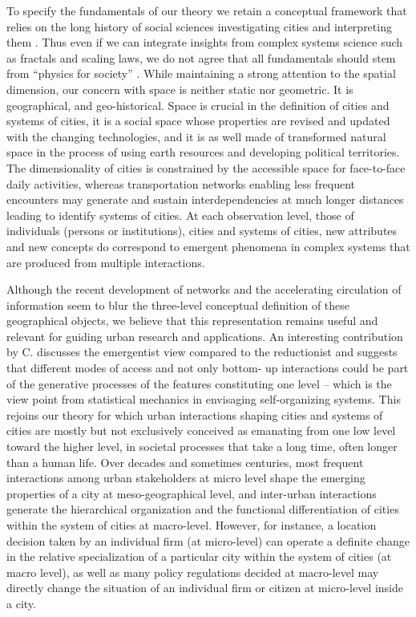 \documentclass[10pt]{article}
\begin{document}
To specify the fundamentals of our theory we retain a conceptual framework that relies on the long history of social sciences investigating cities and interpreting them \citep{pumain1996theoriser}. Thus even if we can integrate insights from complex systems science such as fractals and scaling laws, we do not agree that all fundamentals should stem from ``physics for society'' \citep{caldarelli2018physics}. While maintaining a strong attention to the spatial dimension, our concern with space is neither static nor geometric. It is geographical, and geo-historical. Space is crucial in the definition of cities and systems of cities, it is a social space whose properties are revised and updated with the changing technologies, and it is as well made of transformed natural space in the process of using earth resources and developing political territories. The dimensionality of cities is constrained by the accessible space for face-to-face daily activities, whereas transportation networks enabling less frequent encounters may generate and sustain interdependencies at much longer distances leading to identify systems of cities. At each observation level, those of individuals (persons or institutions), cities and systems of cities, new attributes and new concepts do correspond to emergent phenomena in complex systems that are produced from multiple interactions.

Although the recent development of networks and the accelerating circulation of information seem to blur the three-level conceptual definition of these geographical objects, we believe that this representation remains useful and relevant for guiding urban research and applications. An interesting contribution by C. \cite{roth2006reconstruction} discusses the emergentist view compared to the reductionist and suggests that different modes of access and not only bottom- up interactions could be part of the generative processes of the features constituting one level – which is the view point from statistical mechanics in envisaging self-organizing systems. This rejoins our theory for which urban interactions shaping cities and systems of cities are mostly but not exclusively conceived as emanating from one low level toward the higher level, in societal processes that take a long time, often longer than a human life. Over decades and sometimes centuries, most frequent interactions among urban stakeholders at micro level shape the emerging properties of a city at meso-geographical level, and inter-urban interactions generate the hierarchical organization and the functional differentiation of cities within the system of cities at macro-level. However, for instance, a location decision taken by an individual firm (at micro-level) can operate a definite change in the relative specialization of a particular city within the system of cities (at macro level), as well as many policy regulations decided at macro-level may directly change the situation of an individual firm or citizen at micro-level inside a city.
\end{document}
